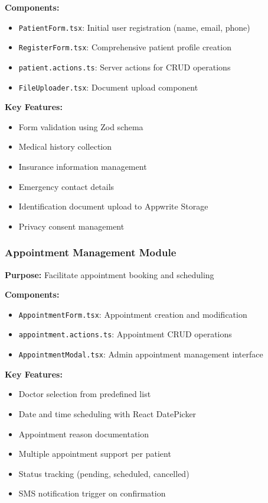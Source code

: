 \documentclass[11pt,a4paper]{article}
\begin{document}
\textbf{Components:}
\begin{itemize}
    \item \texttt{PatientForm.tsx}: Initial user registration (name, email, phone)
    \item \texttt{RegisterForm.tsx}: Comprehensive patient profile creation
    \item \texttt{patient.actions.ts}: Server actions for CRUD operations
    \item \texttt{FileUploader.tsx}: Document upload component
\end{itemize}

\textbf{Key Features:}
\begin{itemize}
    \item Form validation using Zod schema
    \item Medical history collection
    \item Insurance information management
    \item Emergency contact details
    \item Identification document upload to Appwrite Storage
    \item Privacy consent management
\end{itemize}

\subsubsection{Appointment Management Module}
\textbf{Purpose:} Facilitate appointment booking and scheduling

\textbf{Components:}
\begin{itemize}
    \item \texttt{AppointmentForm.tsx}: Appointment creation and modification
    \item \texttt{appointment.actions.ts}: Appointment CRUD operations
    \item \texttt{AppointmentModal.tsx}: Admin appointment management interface
\end{itemize}

\textbf{Key Features:}
\begin{itemize}
    \item Doctor selection from predefined list
    \item Date and time scheduling with React DatePicker
    \item Appointment reason documentation
    \item Multiple appointment support per patient
    \item Status tracking (pending, scheduled, cancelled)
    \item SMS notification trigger on confirmation
\end{itemize}
\end{document}
